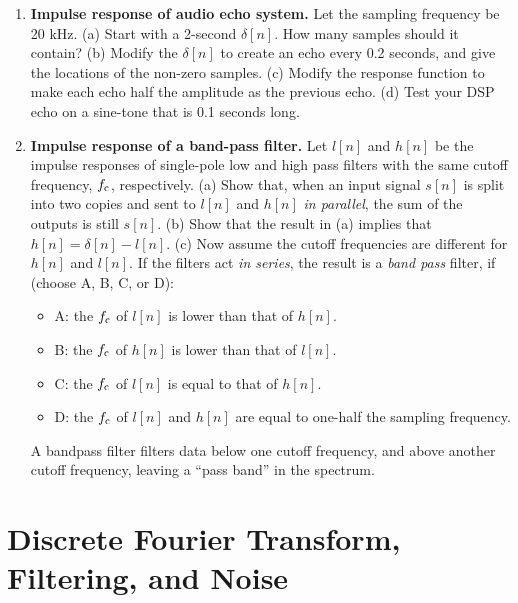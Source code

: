 \documentclass{article}
\begin{document}
\begin{enumerate}
\item \textbf{Impulse response of audio echo system.}  Let the sampling frequency be 20 kHz.  (a) Start with a 2-second $\delta[n]$.  How many samples should it contain? (b) Modify the $\delta[n]$ to create an echo every 0.2 seconds, and give the locations of the non-zero samples.  (c) Modify the response function to make each echo half the amplitude as the previous echo. (d) Test your DSP echo on a sine-tone that is 0.1 seconds long.
\item \textbf{Impulse response of a band-pass filter.} Let $l[n]$ and $h[n]$ be the impulse responses of  single-pole low and high pass filters with the same cutoff frequency, $f_{\rm c}$, respectively.  (a) Show that, when an input signal $s[n]$ is split into two copies and sent to $l[n]$ and $h[n]$ \textit{in parallel}, the sum of the outputs is still $s[n]$. (b) Show that the result in (a) implies that $h[n] = \delta[n] - l[n]$. (c) Now assume the cutoff frequencies are different for $h[n]$ and $l[n]$.  If the filters act \textit{in series}, the result is a \textit{band pass} filter, if (choose A, B, C, or D):
\begin{itemize}
\item A: the $f_{\rm c}$ of $l[n]$ is lower than that of $h[n]$.
\item B: the $f_{\rm c}$ of $h[n]$ is lower than that of $l[n]$.
\item C: the $f_{\rm c}$ of $l[n]$ is equal to that of $h[n]$.
\item D: the $f_{\rm c}$ of $l[n]$ and $h[n]$ are equal to one-half the sampling frequency.
\end{itemize} 
A bandpass filter filters data below one cutoff frequency, and above another cutoff frequency, leaving a ``pass band'' in the spectrum.
\end{enumerate}

\section{Discrete Fourier Transform, \\ Filtering, and Noise}
\end{document}
